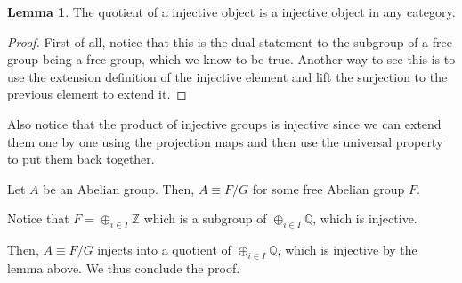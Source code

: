 \documentclass{article}
\theoremstyle{definition}
\newtheorem{lemma}[theorem]{Lemma}
\begin{document}
\begin{lemma}
    The quotient of a injective object is a injective object in any category.
\end{lemma}
\begin{proof}
    First of all, notice that this is the dual statement to the subgroup of a free group being a free group,
    which we know to be true. Another way to see this is to use the extension definition of the injective
    element and lift the surjection to the previous element to extend it.
\end{proof}

Also notice that the product of injective groups is injective since we can extend them one by one using the projection
maps and then use the universal property to put them back together.

Let $ A $ be an Abelian group. Then, $ A \equiv F/G $ for some free Abelian group $ F $.

Notice that $ F = \oplus_{i \in I} \mathbb{Z} $ which is a subgroup of $ \oplus_{i \in I} \mathbb{Q} $, which is injective.

Then, $ A \equiv F/G $ injects into a quotient of $ \oplus_{i \in I} \mathbb{Q} $, which is injective by the lemma above.
We thus conclude the proof.
\end{document}
